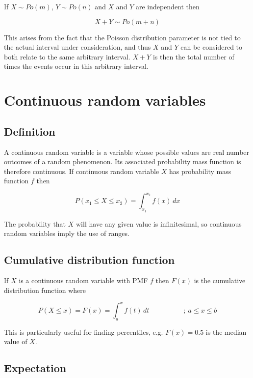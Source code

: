\documentclass[a5paper]{article}
\begin{document}
If $X\sim Po(m)$, $Y\sim Po(n)$ and $X$ and $Y$ are independent then

\begin{equation}
  X + Y\sim Po(m + n)
\end{equation}

This arises from the fact that the Poisson distribution parameter is not tied to
the actual interval under consideration, and thus $X$ and $Y$ can be considered
to both relate to the same arbitrary interval. $X + Y$ is then the total number
of times the events occur in this arbitrary interval.

\section{Continuous random variables}
\subsection{Definition}

A continuous random variable is a variable whose possible values are real number
outcomes of a random phenomenon. Its associated probability mass function is
therefore continuous. If continuous random variable $X$ has probability mass
function $f$ then

\begin{equation}
  P(x_1 \le X \le x_2) = \int_{x_1}^{x_2}f(x)\,dx
\end{equation}

The probability that $X$ will have any given value is infinitesimal, so
continuous random variables imply the use of ranges.

\subsection{Cumulative distribution function}

If $X$ is a continuous random variable with PMF $f$ then $F(x)$ is the
cumulative distribution function where

\begin{equation}
  P(X\le x) = F(x) = \int_a^x f(t)\,dt \hspace{5em};\ a\le x\le b
\end{equation}

This is particularly useful for finding percentiles, e.g. $F(x)=0.5$ is the
median value of $X$.

\subsection{Expectation}
\end{document}

